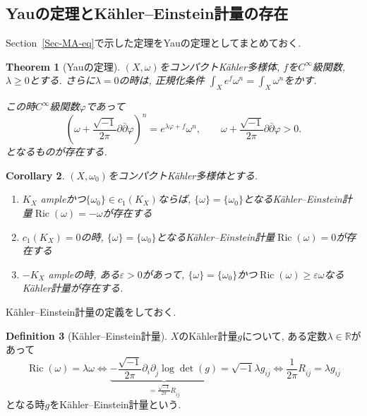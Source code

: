 \documentclass[dvipdfmx,a4paper,11pt]{article} %
\newtheorem{thm}{Theorem}[section]
\newtheorem{cor}[thm]{Corollary}
\theoremstyle{definition}
\newtheorem{defn}[thm]{Definition}
\theoremstyle{remark}
\numberwithin{equation}{section}
\DeclareMathOperator{\Ric}{Ric}
\newcommand{\R}{\mathbb{R}}
\begin{document}
\subsection{Yauの定理とK\"ahler--Einstein計量の存在}
Section~\ref{Sec-MA-eq}で示した定理をYauの定理としてまとめておく.

\begin{thm}[Yauの定理]
\label{thm-Yau-theorem}
$(X, \omega)$をコンパクトK\"ahler多様体, $f$を$C^{\infty}$級関数, $\lambda\geq 0$とする. 
さらに$\lambda=0$の時は, 正規化条件
\(\int_X e^f\omega^n=\int_X\omega^n\)をかす.

この時$C^{\infty}$級関数\(\varphi\)であって
\[
\left(\omega+\frac{\sqrt{-1}}{2\pi}\partial\bar\partial\varphi\right)^n=e^{\lambda\varphi+f}\omega^n,
\qquad
\omega+\frac{\sqrt{-1}}{2\pi}\partial\bar\partial\varphi>0.
\]
となるものが存在する. 
\end{thm}

\begin{cor}
\label{cor-Yau-thm}
$(X, \omega_0)$をコンパクトK\"ahler多様体とする. 
\begin{enumerate}
\item $K_X$ ampleかつ$\{\omega_0\} \in c_1(K_X)$ならば, $\{ \omega\}=\{\omega_0\}$となるK\"ahler--Einstein計量$\Ric(\omega)=-\omega$が存在する
\item $c_1(K_X) =  0$の時, $\{ \omega\}=\{\omega_0\}$となるK\"ahler--Einstein計量$\Ric(\omega)=0$が存在する
\item $-K_X$ ampleの時, ある$\varepsilon>0$があって, $\{ \omega\}=\{\omega_0\}$かつ$\Ric(\omega) \geq \varepsilon \omega$なるK\"ahler計量が存在する.
\end{enumerate}
\end{cor}

K\"ahler--Einstein計量の定義をしておく. 
\begin{defn}[K\"ahler--Einstein計量]
$X$のK\"ahler計量$g$について, ある定数$\lambda \in \R$があって
\[
\Ric(\omega)=\lambda \omega
\Leftrightarrow
\underbrace{-\frac{\sqrt{-1}}{2\pi}\partial_i \partial_{\overline{j}} \log \det(g)}_{=\frac{\sqrt{-1}}{2\pi}R_{i \overline{j}}}
= \sqrt{-1}\lambda g_{i \overline{j}}
\Leftrightarrow
\frac{1}{2\pi}
R_{i \overline{j}}=\lambda g_{i \overline{j}}
\]
となる時$g$をK\"ahler--Einstein計量という. 
\end{defn}
\end{document}
